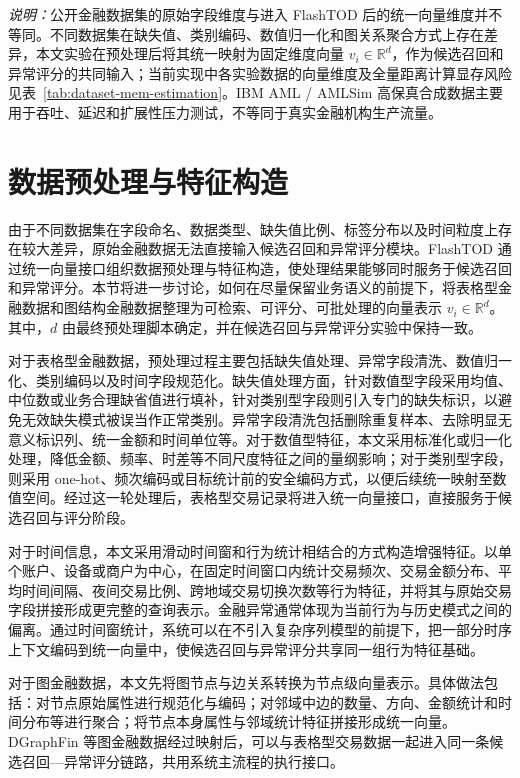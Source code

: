 \textit{说明：}公开金融数据集的原始字段维度与进入 FlashTOD 后的统一向量维度并不等同。不同数据集在缺失值、类别编码、数值归一化和图关系聚合方式上存在差异，本文实验在预处理后将其统一映射为固定维度向量 $v_i\in\mathbb{R}^{d}$，作为候选召回和异常评分的共同输入；当前实现中各实验数据的向量维度及全量距离计算显存风险见表~\ref{tab:dataset-mem-estimation}。IBM AML / AMLSim 高保真合成数据主要用于吞吐、延迟和扩展性压力测试，不等同于真实金融机构生产流量。

\section{数据预处理与特征构造}

由于不同数据集在字段命名、数据类型、缺失值比例、标签分布以及时间粒度上存在较大差异，原始金融数据无法直接输入候选召回和异常评分模块。FlashTOD 通过统一向量接口组织数据预处理与特征构造，使处理结果能够同时服务于候选召回和异常评分。本节将进一步讨论，如何在尽量保留业务语义的前提下，将表格型金融数据和图结构金融数据整理为可检索、可评分、可批处理的向量表示 $v_i\in\mathbb{R}^d$。其中，$d$ 由最终预处理脚本确定，并在候选召回与异常评分实验中保持一致。

对于表格型金融数据，预处理过程主要包括缺失值处理、异常字段清洗、数值归一化、类别编码以及时间字段规范化。缺失值处理方面，针对数值型字段采用均值、中位数或业务合理缺省值进行填补，针对类别型字段则引入专门的缺失标识，以避免无效缺失模式被误当作正常类别。异常字段清洗包括删除重复样本、去除明显无意义标识列、统一金额和时间单位等。对于数值型特征，本文采用标准化或归一化处理，降低金额、频率、时差等不同尺度特征之间的量纲影响；对于类别型字段，则采用 one-hot、频次编码或目标统计前的安全编码方式，以便后续统一映射至数值空间\citep{ieee_cis_fraud,dalpozzolo2015creditcard}。经过这一轮处理后，表格型交易记录将进入统一向量接口，直接服务于候选召回与评分阶段。

对于时间信息，本文采用滑动时间窗和行为统计相结合的方式构造增强特征。以单个账户、设备或商户为中心，在固定时间窗口内统计交易频次、交易金额分布、平均时间间隔、夜间交易比例、跨地域交易切换次数等行为特征，并将其与原始交易字段拼接形成更完整的查询表示。金融异常通常体现为当前行为与历史模式之间的偏离。通过时间窗统计，系统可以在不引入复杂序列模型的前提下，把一部分时序上下文编码到统一向量中，使候选召回与异常评分共享同一组行为特征基础。

对于图金融数据，本文先将图节点与边关系转换为节点级向量表示。具体做法包括：对节点原始属性进行规范化与编码；对邻域中边的数量、方向、金额统计和时间分布等进行聚合；将节点本身属性与邻域统计特征拼接形成统一向量。DGraphFin 等图金融数据经过映射后，可以与表格型交易数据一起进入同一条候选召回---异常评分链路，共用系统主流程的执行接口\citep{dgraphfin_paper}。

